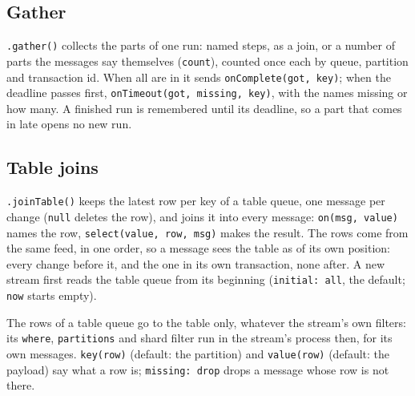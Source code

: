 \subsection{Gather}

\texttt{.gather()} collects the parts of one run: named steps, as a join, or a number of parts the messages say themselves (\texttt{count}), counted once each by queue, partition and transaction id. When all are in it sends \texttt{onComplete(got,\ key)}; when the deadline passes first, \texttt{onTimeout(got,\ missing,\ key)}, with the names missing or how many. A finished run is remembered until its deadline, so a part that comes in late opens no new run.



\subsection{Table joins}

\texttt{.joinTable()} keeps the latest row per key of a table queue, one message per change (\texttt{null} deletes the row), and joins it into every message: \texttt{on(msg,\ value)} names the row, \texttt{select(value,\ row,\ msg)} makes the result. The rows come from the same feed, in one order, so a message sees the table as of its own position: every change before it, and the one in its own transaction, none after. A new stream first reads the table queue from its beginning (\texttt{initial:\ \textquotesingle{}all\textquotesingle{}}, the default; \texttt{\textquotesingle{}now\textquotesingle{}} starts empty).


The rows of a table queue go to the table only, whatever the stream's own filters: its \texttt{where}, \texttt{partitions} and shard filter run in the stream's process then, for its own messages. \texttt{key(row)} (default: the partition) and \texttt{value(row)} (default: the payload) say what a row is; \texttt{missing:\ \textquotesingle{}drop\textquotesingle{}} drops a message whose row is not there.


